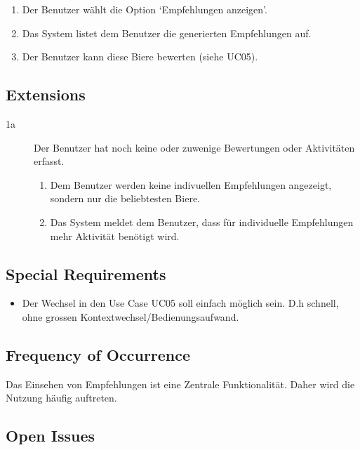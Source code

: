 \documentclass[10pt,a4paper]{scrartcl}
\begin{document}
\begin{enumerate}
\item Der Benutzer wählt die Option `Empfehlungen anzeigen'.
\item Das System listet dem Benutzer die generierten Empfehlungen auf.
\item Der Benutzer kann diese Biere bewerten (siehe UC05).
\end{enumerate}


\subsection*{Extensions}

\begin{description}
\item[1a] Der Benutzer hat noch keine oder zuwenige Bewertungen oder Aktivitäten erfasst.
	\begin{enumerate}
	\item Dem Benutzer werden keine indivuellen Empfehlungen angezeigt, sondern nur die beliebtesten Biere.
	\item Das System meldet dem Benutzer, dass für individuelle Empfehlungen mehr Aktivität benötigt wird.
	\end{enumerate}

\end{description}


\subsection*{Special Requirements}

\begin{itemize}
\item Der Wechsel in den Use Case UC05 soll einfach möglich sein. D.h schnell, ohne grossen Kontextwechsel/Bedienungsaufwand.
\end{itemize}



\subsection*{Frequency of Occurrence}

Das Einsehen von Empfehlungen ist eine Zentrale Funktionalität. Daher wird die Nutzung häufig auftreten. 

\subsection*{Open Issues}
\end{document}
